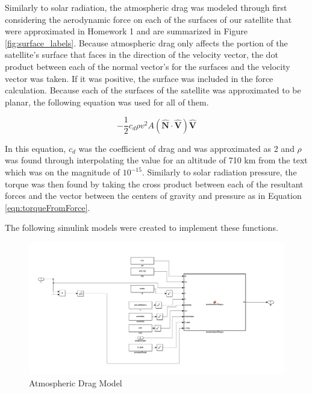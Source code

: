 Similarly to solar radiation, the atmospheric drag was modeled through first considering the aerodynamic force on each of the surfaces of our satellite that were approximated in Homework 1 and are summarized in Figure \ref{fig:surface_labels}. Because atmospheric drag only affects the portion of the satellite's surface that faces in the direction of the velocity vector, the dot product between each of the normal vector's for the surfaces and the velocity vector was taken. If it was positive, the surface was included in the force calculation. Because each of the surfaces of the satellite was approximated to be planar, the following equation was used for all of them.

\begin{equation}
    - \frac{1}{2} c_d \rho v^2 A ( \hat{\boldsymbol{N}} \cdot \hat{\boldsymbol{V}} ) \hat{\boldsymbol{V}}
\end{equation}

In this equation, $c_d$ was the coefficient of drag and was approximated as 2 and $\rho$ was found through interpolating the value for an altitude of 710 km from the text which was on the magnitude of $10^{-15}$. Similarly to solar radiation pressure, the torque was then found by taking the cross product between each of the resultant forces and the vector between the centers of gravity and pressure as in Equation \ref{eqn:torqueFromForce}.

The following simulink models were created to implement these functions.

\begin{figure}[H]
    \centering
    \captionsetup{justification = centering}
    \includegraphics[width = 15cm]{Images/PS5/aeroTorqueSimulink.png}
    \caption{Atmospheric Drag Model}
    \label{fig:simulink_aero}
\end{figure}

